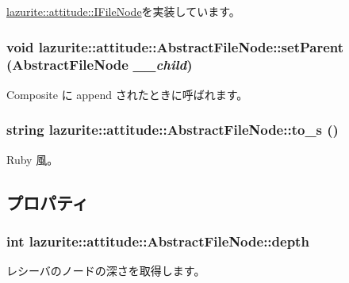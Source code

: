 \hyperlink{interfacelazurite_1_1attitude_1_1_i_file_node_ae6703f58ed2388eafcfce1c5947498e6}{lazurite::attitude::IFileNode}を実装しています。\hypertarget{classlazurite_1_1attitude_1_1_abstract_file_node_a3625419d7cf9f8332361b4a2bedef953}{
\subsubsection[{setParent}]{\setlength{\rightskip}{0pt plus 5cm}void lazurite::attitude::AbstractFileNode::setParent ({\bf AbstractFileNode} {\em \_\-\_\-child})}}
\label{classlazurite_1_1attitude_1_1_abstract_file_node_a3625419d7cf9f8332361b4a2bedef953}
Composite に append されたときに呼ばれます。 \hypertarget{classlazurite_1_1attitude_1_1_abstract_file_node_a6a973ebb89790b0b5d2f149c25433b25}{
\subsubsection[{to\_\-s}]{\setlength{\rightskip}{0pt plus 5cm}string lazurite::attitude::AbstractFileNode::to\_\-s ()}}
\label{classlazurite_1_1attitude_1_1_abstract_file_node_a6a973ebb89790b0b5d2f149c25433b25}
Ruby 風。 

\subsection{プロパティ}
\hypertarget{classlazurite_1_1attitude_1_1_abstract_file_node_a1f0ba501fb7f35eec94d1c5efde04cc9}{
\subsubsection[{depth}]{\setlength{\rightskip}{0pt plus 5cm}int lazurite::attitude::AbstractFileNode::depth}}
\label{classlazurite_1_1attitude_1_1_abstract_file_node_a1f0ba501fb7f35eec94d1c5efde04cc9}
レシーバのノードの深さを取得します。 

